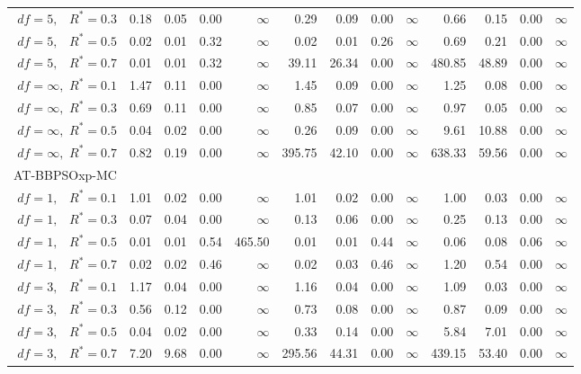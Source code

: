 \documentclass[cmbright]{staauth}
\begin{document}
\begin{table}[ht]
{\begin{tabular}{r|rrrr|rrrr|rrrr}
  $df = 5,\enspace$ $R^* =0.3$ & 0.18 & 0.05 & 0.00 & $\infty$ & 0.29 & 0.09 & 0.00 & $\infty$ & 0.66 & 0.15 & 0.00 & $\infty$ \\
  $df = 5,\enspace$ $R^* =0.5$ & 0.02 & 0.01 & 0.32 & $\infty$ & 0.02 & 0.01 & 0.26 & $\infty$ & 0.69 & 0.21 & 0.00 & $\infty$ \\
  $df = 5,\enspace$ $R^* =0.7$ & 0.01 & 0.01 & 0.32 & $\infty$ & 39.11 & 26.34 & 0.00 & $\infty$ & 480.85 & 48.89 & 0.00 & $\infty$ \\
  $df = \infty,$ $R^* =0.1$ & 1.47 & 0.11 & 0.00 & $\infty$ & 1.45 & 0.09 & 0.00 & $\infty$ & 1.25 & 0.08 & 0.00 & $\infty$ \\
  $df = \infty,$ $R^* =0.3$ & 0.69 & 0.11 & 0.00 & $\infty$ & 0.85 & 0.07 & 0.00 & $\infty$ & 0.97 & 0.05 & 0.00 & $\infty$ \\
  $df = \infty,$ $R^* =0.5$ & 0.04 & 0.02 & 0.00 & $\infty$ & 0.26 & 0.09 & 0.00 & $\infty$ & 9.61 & 10.88 & 0.00 & $\infty$ \\
  $df = \infty,$ $R^* =0.7$ & 0.82 & 0.19 & 0.00 & $\infty$ & 395.75 & 42.10 & 0.00 & $\infty$ & 638.33 & 59.56 & 0.00 & $\infty$ \\
\hline
\multicolumn{1}{l|}{AT-BBPSOxp-MC} &&&&&&&&&&&&\\
  $df = 1,\enspace$ $R^* =0.1$ & 1.01 & 0.02 & 0.00 & $\infty$ & 1.01 & 0.02 & 0.00 & $\infty$ & 1.00 & 0.03 & 0.00 & $\infty$ \\
  $df = 1,\enspace$ $R^* =0.3$ & 0.07 & 0.04 & 0.00 & $\infty$ & 0.13 & 0.06 & 0.00 & $\infty$ & 0.25 & 0.13 & 0.00 & $\infty$ \\
  $df = 1,\enspace$ $R^* =0.5$ & 0.01 & 0.01 & 0.54 & 465.50 & 0.01 & 0.01 & 0.44 & $\infty$ & 0.06 & 0.08 & 0.06 & $\infty$ \\
  $df = 1,\enspace$ $R^* =0.7$ & 0.02 & 0.02 & 0.46 & $\infty$ & 0.02 & 0.03 & 0.46 & $\infty$ & 1.20 & 0.54 & 0.00 & $\infty$ \\
  $df = 3,\enspace$ $R^* =0.1$ & 1.17 & 0.04 & 0.00 & $\infty$ & 1.16 & 0.04 & 0.00 & $\infty$ & 1.09 & 0.03 & 0.00 & $\infty$ \\
  $df = 3,\enspace$ $R^* =0.3$ & 0.56 & 0.12 & 0.00 & $\infty$ & 0.73 & 0.08 & 0.00 & $\infty$ & 0.87 & 0.09 & 0.00 & $\infty$ \\
  $df = 3,\enspace$ $R^* =0.5$ & 0.04 & 0.02 & 0.00 & $\infty$ & 0.33 & 0.14 & 0.00 & $\infty$ & 5.84 & 7.01 & 0.00 & $\infty$ \\
  $df = 3,\enspace$ $R^* =0.7$ & 7.20 & 9.68 & 0.00 & $\infty$ & 295.56 & 44.31 & 0.00 & $\infty$ & 439.15 & 53.40 & 0.00 & $\infty$ \\

\end{tabular}}
\end{table}
\end{document}
